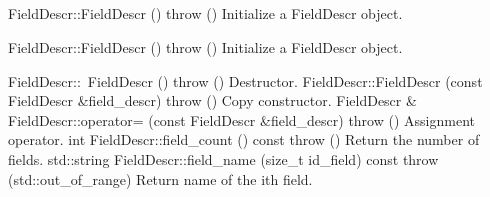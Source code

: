 \documentclass{article}
\begin{document}
\subsection{}
\subsection{}
\subsection{}
\subsection{}
\subsection{}

\subsubsection{}


FieldDescr::FieldDescr () throw ()
 	Initialize a FieldDescr object.

FieldDescr::FieldDescr () throw ()
 	Initialize a FieldDescr object.

FieldDescr::~FieldDescr () throw ()
 	Destructor.
FieldDescr::FieldDescr (const FieldDescr \&field\_descr) throw ()
 	Copy constructor.
FieldDescr \& 	FieldDescr::operator= (const FieldDescr \&field\_descr) throw ()
 	Assignment operator.
int 	FieldDescr::field\_count () const throw ()
 	Return the number of fields.
std::string 	FieldDescr::field\_name (size\_t id\_field) const throw (std::out\_of\_range)
 	Return name of the ith field.
\end{document}
